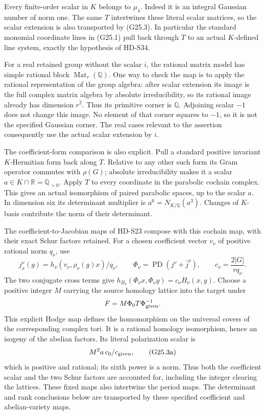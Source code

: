 Every finite-order scalar in \(K\) belongs to \(\mu_4\).
Indeed it is an integral Gaussian number of norm one.
The same \(T\) intertwines these literal scalar matrices,
so the scalar extension is also transported by (G25.3).
In particular the standard monomial coordinate lines in
(G25.1) pull back through \(T\) to an actual \(K\)-defined
line system, exactly the hypothesis of HD-S34.

For a real retained group without the scalar \(i\), the
rational matrix model has simple rational block
\(\operatorname{Mat}_r(\mathbb Q)\). One way to check the
map is to apply the rational representation of the group
algebra: after scalar extension its image is the full complex
matrix algebra by absolute irreducibility, so its rational
image already has dimension \(r^2\). Thus its primitive
corner is \(\mathbb Q\). Adjoining scalar \(-1\) does
not change this image. No element of that corner squares
to \(-1\), so it is not the specified Gaussian corner.
The real cases relevant to the assertion consequently use
the actual scalar extension by \(i\).

The coefficient-form comparison is also explicit. Pull a
standard positive invariant \(K\)-Hermitian form back along
\(T\). Relative to any other such form its Gram operator
commutes with \(\rho(G)\); absolute irreducibility makes
it a scalar \(a\in K\cap\mathbb R=\mathbb Q_{>0}\).
Apply \(T\) to every coordinate in the parabolic cochain
complex. This gives an actual isomorphism of paired
parabolic spaces, up to the scalar \(a\). In dimension six
its determinant multiplier is \(a^6=N_{K/\mathbb Q}(a^3)\).
Changes of \(K\)-basis contribute the norm of their determinant.

The coefficient-to-Jacobian maps of HD-S23 compose with
this cochain map, with their exact Schur factors retained.
For a chosen coefficient vector \(v_\nu\) of positive rational
norm \(q_\nu\), use
\[
 j^\nu_x(g)=h_\nu(v_\nu,\rho_\nu(g)x)/q_\nu,\qquad
 \Phi_\nu=\operatorname{PD}(j^\nu+\bar j^\nu),\qquad
 c_\nu=\frac{2|G|}{r q_\nu}.
\]
The two conjugate cross terms give
\(h_{B_\nu}(\Phi_\nu x,\Phi_\nu y)=c_\nu H_\nu(x,y)\).
Choose a positive integer \(M\) carrying the source homology
lattice into the target under
\[
                  F=M\Phi_0T\Phi_{\rm given}^{-1}.
\]
This explicit Hodge map defines the homomorphism on the
universal covers of the corresponding complex tori. It is
a rational homology isomorphism, hence an isogeny of the
abelian factors. Its literal polarization scalar is
\[
                    M^2a\,c_0/c_{\rm given},                \tag{G25.3a}
\]
which is positive and rational; its sixth power is a norm.
Thus both the coefficient scalar and the two Schur factors
are accounted for, including the integer clearing the lattices.
These fixed maps also intertwine the period maps. The
determinant and rank conclusions below are transported by
these specified coefficient and abelian-variety maps.

